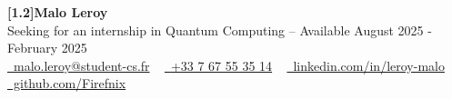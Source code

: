 \begin{center}
    {\Huge\bfseries\sffamily \scalebox{1.0}[1.2]{Malo Leroy}}
    \\ Seeking for an internship in Quantum Computing -- Available August 2025 - February 2025 \\
    \small
    \href{mailto:malo.leroy@student-cs.fr}{\raisebox{-0.2\height}\faEnvelope\  malo.leroy@student-cs.fr} ~
    \href{tel:+33767553514}{\raisebox{-0.2\height}\faPhone\  {+33 7 67 55 35 14}} ~
    \href{https://linkedin.com/in/leroy-malo}{\raisebox{-0.2\height}\faLinkedin\ linkedin.com/in/leroy-malo}  ~
    \href{https://github.com/Firefnix}{\raisebox{-0.2\height}\faGithub\ github.com/Firefnix}
\end{center}
